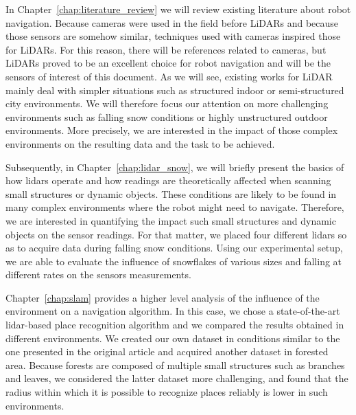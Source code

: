 In Chapter~\ref{chap:literature_review} we will review existing literature about robot navigation. Because cameras were used in the field before LiDARs and because those sensors are somehow similar, techniques used with cameras inspired those for LiDARs. For this reason, there will be references related to cameras, but LiDARs proved to be an excellent choice for robot navigation and will be the sensors of interest of this document. As we will see, existing works for LiDAR mainly deal with simpler situations such as structured indoor or semi-structured city environments. We will therefore focus our attention on more challenging environments such as falling snow conditions or highly unstructured outdoor environments. More precisely, we are interested in the impact of those complex environments on the resulting data and the task to be achieved.

Subsequently, in Chapter~\ref{chap:lidar_snow}, we will briefly present the basics of how \gls*{lidar}s operate and how readings are theoretically affected when scanning small structures or dynamic objects. These conditions are likely to be found in many complex environments where the robot might need to navigate. Therefore, we are interested in quantifying the impact such small structures and dynamic objects on the sensor readings. For that matter, we placed four different \gls*{lidar}s so as to acquire data during falling snow conditions. Using our experimental setup, we are able to evaluate the influence of snowflakes of various sizes and falling at different rates on the sensors measurements. 

Chapter~\ref{chap:slam} provides a higher level analysis of the influence of the environment on a navigation algorithm. In this case, we chose a state-of-the-art \gls*{lidar}-based place recognition algorithm and we compared the results obtained in different environments. We created our own dataset in conditions similar to the one presented in the original article and acquired another dataset in forested area. Because forests are composed of multiple small structures such as branches and leaves, we considered the latter dataset more challenging, and found that the radius within which it is possible to recognize places reliably is lower in such environments.
